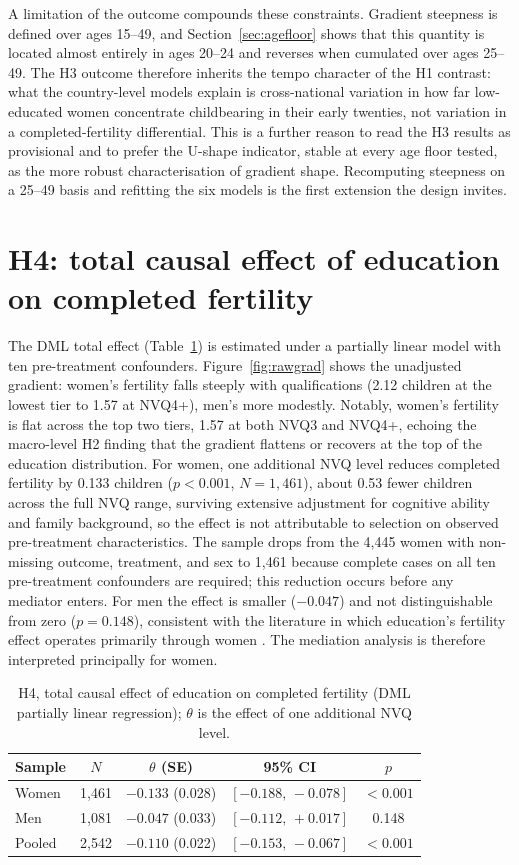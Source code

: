 \documentclass[12pt,a4paper]{report}
\begin{document}
A limitation of the outcome compounds these constraints. Gradient steepness is
defined over ages 15--49, and Section~\ref{sec:agefloor} shows that this quantity is located almost
entirely in ages 20--24 and reverses when cumulated over ages 25--49. The H3 outcome therefore inherits
the tempo character of the H1 contrast: what the country-level models explain is cross-national
variation in how far low-educated women concentrate childbearing in their early twenties, not variation
in a completed-fertility differential. This is a further reason to read the H3 results as
provisional and to prefer the U-shape indicator, stable at every age floor tested, as the more robust
characterisation of gradient shape. Recomputing steepness on a 25--49 basis and refitting the six
models is the first extension the design invites.

\section{H4: total causal effect of education on completed fertility}
The DML total effect (Table~\ref{tab:dml}) is estimated under a partially linear model with ten
pre-treatment confounders. Figure~\ref{fig:rawgrad} shows the unadjusted gradient: women's fertility
falls steeply with qualifications (2.12 children at the lowest tier to 1.57 at NVQ4+), men's more
modestly. Notably, women's fertility is flat across the top two tiers, 1.57 at both NVQ3 and NVQ4+, echoing
the macro-level H2 finding that the gradient flattens or recovers at the
top of the education distribution. For women, one additional NVQ level reduces completed fertility by 0.133 children
($p<0.001$, $N=1{,}461$), about 0.53 fewer children across the full NVQ range, surviving extensive
adjustment for cognitive ability and family background, so the effect is not attributable to selection
on observed pre-treatment characteristics. The sample drops from the 4,445 women with non-missing
outcome, treatment, and sex to 1,461 because complete cases on all ten
pre-treatment confounders are required; this reduction occurs before any mediator enters.
For men the effect is smaller ($-0.047$) and not
distinguishable from zero ($p=0.148$), consistent with the literature in which education's fertility
effect operates primarily through women \citep{skirbekk2008}. The mediation analysis is therefore
interpreted principally for women.

\begin{table}[ht]
\centering
\caption{H4, total causal effect of education on completed fertility (DML partially linear regression); $\theta$ is the effect of one additional NVQ level.}
\label{tab:dml}
\begin{tabular}{@{}lcccc@{}}
\toprule
Sample & $N$ & $\theta$ (SE) & 95\% CI & $p$ \\
\midrule
Women  & 1{,}461 & $-0.133$ (0.028) & $[-0.188,\,-0.078]$ & $<0.001$ \\
Men    & 1{,}081 & $-0.047$ (0.033) & $[-0.112,\,+0.017]$ & 0.148 \\
Pooled & 2{,}542 & $-0.110$ (0.022) & $[-0.153,\,-0.067]$ & $<0.001$ \\
\bottomrule
\end{tabular}
\end{table}
\end{document}
